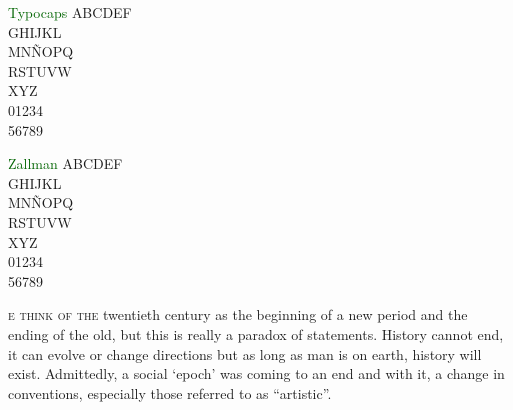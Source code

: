 \documentclass[11pt]{article}
\newcommand{\blInitSz}{20}
\begin{document}
\textcolor{darkgreen}{Typocaps}
{\blSetTypocaps\fontsize{\blInitSz}{40}\selectfont ABCDEF\\ GHIJKL\\ MNÑOPQ\\ RSTUVW\\ XYZ\\ 01234\\ 56789}

\textcolor{darkgreen}{Zallman}
{\blSetZallman\fontsize{\blInitSz}{40}\selectfont ABCDEF\\ GHIJKL\\ MNÑOPQ\\ RSTUVW\\ XYZ\\ 01234\\ 56789}


\lettrine[lines=2, lraise=0.08, findent=0.2em, nindent=0em]{} 
{e think of the} twentieth century as the beginning of a new period  
and the ending of the old, but this is really a paradox of statements.  
History cannot end, it can evolve or change directions but as long as  
man is on earth, history will exist. Admittedly, a social `epoch' was  
coming to an end and with it, a change in conventions, especially  
those referred to as ``artistic''.
\end{document}
